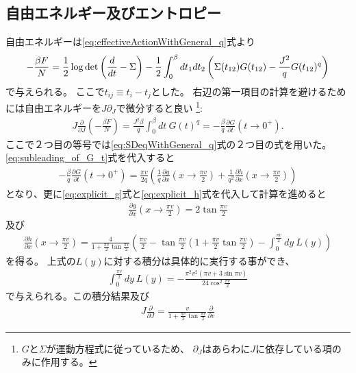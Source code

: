 \subsection{自由エネルギー及びエントロピー}
自由エネルギーは\eqref{eq:effectiveActionWithGeneral_q}式より
\begin{align}
	-\frac{\beta F}{N} = \frac{1}{2}\log\det\left(\frac{d}{dt} - \Sigma\right)
		- \frac{1}{2}\int_0^{\beta} dt_1 dt_2
		\left(\Sigma(t_{12})G(t_{12}) - \frac{J^2}{q} G(t_{12})^q \right)
\end{align}
で与えられる。
ここで$t_{ij} \equiv t_i - t_j$とした。
右辺の第一項目の計算を避けるためには自由エネルギーを$J\partial_J$で微分すると良い
\footnote{$G$と$\Sigma$が運動方程式に従っているため、
$\partial_J$はあらわに$J$に依存している項のみに作用する。}:
\begin{align}
	J\frac{\partial}{\partial J}\left(-\frac{\beta F}{N}\right)
	= \frac{J^2 \beta}{q}\int_0^{\beta} dt\ G(t)^q
	= -\frac{\beta}{q}\frac{\partial G}{\partial t}(t \to 0^+).
	\label{eq:differentiated_free_energy}
\end{align}
ここで２つ目の等号では\eqref{eq:SDeqWithGeneral_q}式の２つ目の式を用いた。
\eqref{eq:subleading_of_G_t}式を代入すると
\begin{align}
	-\frac{\beta}{q}\frac{\partial G}{\partial t}(t \to 0^+)
	= \frac{\pi v}{2q}\left(
		\frac{1}{q}\frac{\partial g}{\partial x}\left(x \to \frac{\pi v}{2}\right)
		+ \frac{1}{q^2}\frac{\partial h}{\partial x}\left(x \to \frac{\pi v}{2}\right)
	\right)
\end{align}
となり、更に\eqref{eq:explicit_g}式と\eqref{eq:explicit_h}式を代入して計算を進めると
\begin{align}
	\frac{\partial g}{\partial x}\left(x \to \frac{\pi v}{2}\right)
	= 2 \tan \frac{\pi v}{2}
\end{align}
及び
\begin{align}
	\frac{\partial h}{\partial x}\left(x \to \frac{\pi v}{2}\right)
	= \frac{4}{1 + \frac{\pi v}{2}\tan \frac{\pi v}{2}}\left(
		\frac{\pi v}{2}
		- \tan \frac{\pi v}{2}\left(1 + \frac{\pi v}{2}\tan \frac{\pi v}{2}\right)
		- \int_0^{\frac{\pi v}{2}} dy\ L(y)
	\right)
\end{align}
を得る。
上式の$L(y)$に対する積分は具体的に実行する事ができ、
\begin{align}
	\int_0^{\frac{\pi v}{2}} dy\ L(y)
		= -\frac{\pi^2 v^2(\pi v + 3\sin \pi v)}{24 \cos^2 \frac{\pi v}{2}}
\end{align}
で与えられる\cite{tarnopolsky}。この積分結果及び
\begin{align}
	J\frac{\partial}{\partial J} 
		= \frac{v}{1 + \frac{\pi v}{2}\tan \frac{\pi v}{2}}\frac{\partial}{\partial v}
\end{align}
